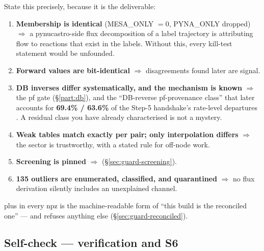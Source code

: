 State this precisely, because it is the deliverable:

\begin{enumerate}
\item \textbf{Membership is identical} (MESA\_ONLY $= 0$, PYNA\_ONLY dropped)
      $\Rightarrow$ a pynucastro-side flux decomposition of a label trajectory
      is attributing flow to reactions that exist in the labels. Without this,
      every kill-test statement would be unfounded.
\item \textbf{Forward values are bit-identical} $\Rightarrow$ disagreements
      found later are signal.
\item \textbf{DB inverses differ systematically, and the mechanism is known}
      $\Rightarrow$ the pf gate (\S\ref{part:db}), and the ``DB-reverse
      pf-provenance class'' that later accounts for \textbf{69.4\% / 63.6\%} of
      the Step-5 handshake's rate-level departures . A
      residual class you have already characterised is not a mystery.
\item \textbf{Weak tables match exactly per pair; only interpolation differs}
      $\Rightarrow$ the \Ye{} sector is trustworthy, with a stated rule for
      off-node work.
\item \textbf{Screening is pinned} $\Rightarrow$ 
      (\S\ref{sec:guard-screening}).
\item \textbf{135 outliers are enumerated, classified, and quarantined}
      $\Rightarrow$ no flux derivation silently includes an unexplained channel.
\end{enumerate}

 plus  in every
npz is the machine-readable form of ``this build is the reconciled one'' --- and
 refuses anything else
(\S\ref{sec:guard-reconciled}).

\subsection*{Self-check --- verification and S6}
\label{sec:selfcheck-verification}

